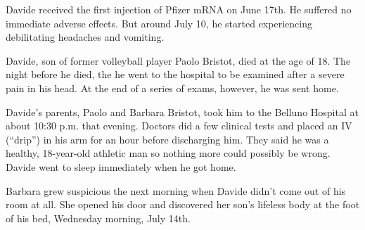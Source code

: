 Davide received the first injection of Pfizer mRNA on June 17th. He suffered no
immediate adverse effects. But around July 10, he started experiencing
debilitating headaches and vomiting.

Davide, son of former volleyball player Paolo Bristot, died at the age of
18. The night before he died, the he went to the hospital to be examined after a
severe pain in his head. At the end of a series of exams, however, he was sent
home.

Davide’s parents, Paolo and Barbara Bristot, took him to the Belluno Hospital at
about 10:30 p.m. that evening. Doctors did a few clinical tests and placed an IV
(“drip”) in his arm for an hour before discharging him. They said he was a
healthy, 18-year-old athletic man so nothing more could possibly be
wrong. Davide went to sleep immediately when he got home.

Barbara grew suspicious the next morning when Davide didn’t come out of his room
at all. She opened his door and discovered her son’s lifeless body at the foot
of his bed, Wednesday morning, July 14th.


